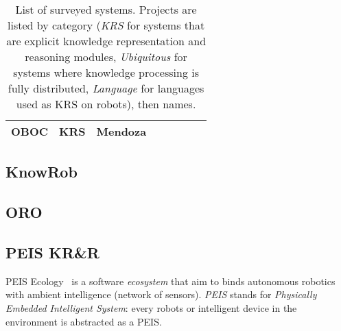 \begin{landscape}
\begin{table}
\begin{center}
\begin{tabular}{p{2.2cm}p{1.6cm}p{4cm}lp{2.4cm}p{3.4cm}p{2.8cm}p{1.5cm}}
OBOC & KRS & Mendoza & & & & & \cite{Mendoza2005} \\

\bottomrule

\end{tabular}
\end{center}

\caption{List of surveyed systems. Projects are listed by category (\emph{KRS}
for systems that are explicit knowledge representation and reasoning modules,
\emph{Ubiquitous} for systems where knowledge processing is fully distributed,
\emph{Language} for languages used as KRS on robots), then names.}

\label{table|surveyed-systems}
\end{table}
\end{landscape}


\subsection{KnowRob}
\label{sect|knowrob}

\subsection{ORO}
\label{sect|oro}

\subsection{PEIS KR\&R}
\label{sect|peis-ecology}


{\sc PEIS Ecology}~\cite{Saffiotti2005} is a software \emph{ecosystem} that aim to binds autonomous
robotics with ambient intelligence (network of sensors). \emph{PEIS} stands for
\emph{Physically Embedded Intelligent System}: every robots or intelligent
device in the environment is abstracted as a PEIS.

